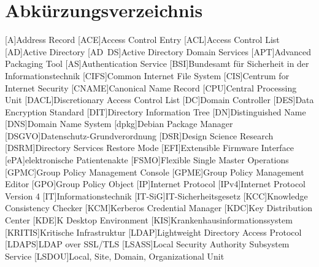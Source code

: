 \section*{Abkürzungsverzeichnis}
\begin{acronym}
	{Ad\-dress Re\-cord}
	[ACE]{Ac\-cess Con\-trol En\-try}
	[ACL]{Ac\-cess Con\-trol List}
	[AD]{Ac\-tive Di\-rec\-to\-ry}
	[AD~DS]{Ac\-tive Di\-rec\-to\-ry Do\-main Ser\-vices}
	[APT]{Ad\-van\-ced Pa\-cka\-ging Tool}
	[AS]{Au\-then\-ti\-ca\-ti\-on Ser\-vice}
	[BSI]{Bun\-des\-amt für Si\-cher\-heit in der In\-for\-ma\-ti\-ons\-tech\-nik}
	[CIFS]{Com\-mon In\-ter\-net File Sys\-tem}
	[CIS]{Cen\-trum for In\-ter\-net Se\-cu\-ri\-ty}
	[CNAME]{Ca\-no\-ni\-cal Name Re\-cord}
	[CPU]{Cen\-tral Pro\-ces\-sing U\-nit}
	[DACL]{Dis\-cre\-tio\-na\-ry Ac\-cess Con\-trol List}
	[DC]{Do\-main Con\-trol\-ler}
	[DES]{Da\-ta En\-cryp\-ti\-on Stan\-dard}
	[DIT]{Di\-rec\-to\-ry In\-for\-ma\-ti\-on Tree}
	[DN]{Dis\-tin\-guished Name}
	[DNS]{Do\-main Name Sys\-tem}
	[dpkg]{De\-bi\-an Pa\-cka\-ge Ma\-na\-ger}
	[DSGVO]{Da\-ten\-schutz-Grund\-ver\-ord\-nung}
	[DSR]{De\-sign Sci\-ence Re\-search}
	[DSRM]{Di\-rec\-to\-ry Ser\-vices Re\-store Mode}
	[EFI]{Ex\-ten\-si\-ble Firm\-ware In\-ter\-face}
	[ePA]{elek\-tro\-ni\-sche Pa\-ti\-en\-ten\-ak\-te}
	[FSMO]{Fle\-xi\-ble Sin\-gle Mas\-ter Ope\-ra\-ti\-ons}
	[GPMC]{Group Po\-li\-cy Ma\-nage\-ment Con\-sole}
	[GPME]{Group Po\-li\-cy Ma\-nage\-ment Edi\-tor}
	[GPO]{Group Po\-li\-cy Ob\-ject}
	[IP]{In\-ter\-net Pro\-to\-col}
	[IPv4]{In\-ter\-net Pro\-to\-col Ver\-si\-on 4}
	[IT]{In\-for­ma\-ti\-ons\-tech\-nik}
	[IT-SiG]{IT-Si\-cher\-heits\-ge\-setz}
	[KCC]{Know\-ledge Con\-sis\-ten\-cy Che\-cker}
	[KCM]{Ker\-be\-ros Cre\-den\-tial Ma\-na\-ger}
	[KDC]{Key Dis\-tri\-bu\-ti\-on Cen\-ter}
	[KDE]{K Desk\-top En\-vi\-ron\-ment}
	[KIS]{Kran\-ken\-haus\-in\-for\-ma\-ti\-ons\-sys\-tem}
	[KRITIS]{Kri\-ti\-sche In\-fra\-struk\-tur}
	[LDAP]{Light\-weight Di\-rec\-to\-ry Ac\-cess Pro\-to\-col}
	[LDAPS]{LDAP over SSL/TLS}
	[LSASS]{Lo\-cal Se\-cu\-ri\-ty Au\-tho\-ri\-ty Sub\-sys\-tem Ser\-vice}
	[LSDOU]{Lo\-cal, Site, Do\-main, Or\-ga\-ni\-za\-tio\-nal U\-nit}

\end{acronym}
